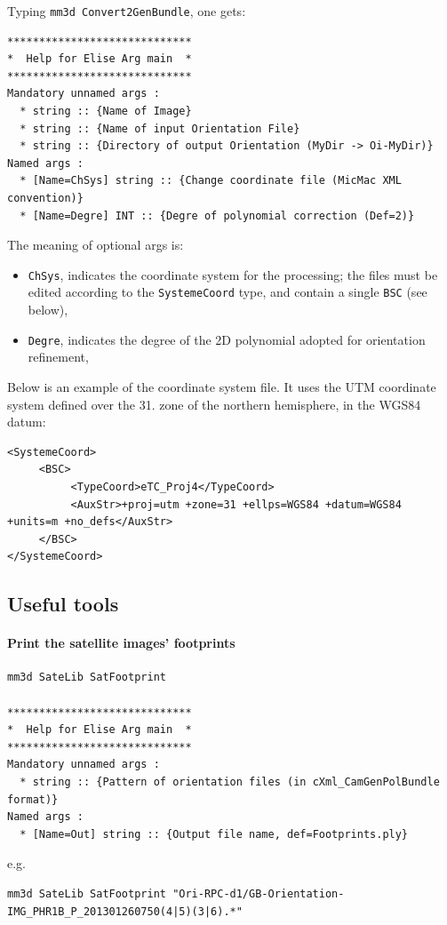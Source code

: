 \vspace{\baselineskip}
Typing {\tt mm3d Convert2GenBundle}, one gets:

\begin{verbatim}
*****************************
*  Help for Elise Arg main  *
*****************************
Mandatory unnamed args : 
  * string :: {Name of Image}
  * string :: {Name of input Orientation File}
  * string :: {Directory of output Orientation (MyDir -> Oi-MyDir)}
Named args : 
  * [Name=ChSys] string :: {Change coordinate file (MicMac XML convention)}
  * [Name=Degre] INT :: {Degre of polynomial correction (Def=2)}
\end{verbatim}

The meaning of optional args is:

\begin{itemize}
   \item {\tt ChSys}, indicates the coordinate system for the processing; the files must be edited according to the {\tt SystemeCoord} type, and contain a single {\tt BSC} (see below),
   \item {\tt Degre}, indicates the degree of the 2D polynomial adopted for orientation refinement,
\end{itemize}

Below is an example of the coordinate system file. It uses the UTM coordinate system defined over the 31. zone of the northern hemisphere, in the WGS84 datum:

\begin{verbatim}
<SystemeCoord>
     <BSC>
          <TypeCoord>eTC_Proj4</TypeCoord>
          <AuxStr>+proj=utm +zone=31 +ellps=WGS84 +datum=WGS84 +units=m +no_defs</AuxStr>
     </BSC>
</SystemeCoord>
\end{verbatim}


\subsection{Useful tools}

\paragraph*{Print the satellite images' footprints}
%
\vspace{0.5cm}
%
\begin{verbatim}
mm3d SateLib SatFootprint

*****************************
*  Help for Elise Arg main  *
*****************************
Mandatory unnamed args : 
  * string :: {Pattern of orientation files (in cXml_CamGenPolBundle format)}
Named args : 
  * [Name=Out] string :: {Output file name, def=Footprints.ply}
\end{verbatim}
%
e.g. 
\begin{verbatim}
mm3d SateLib SatFootprint "Ori-RPC-d1/GB-Orientation-IMG_PHR1B_P_201301260750(4|5)(3|6).*"
\end{verbatim}


